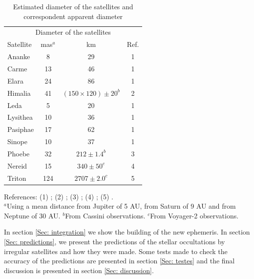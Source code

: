 \documentclass[useAMS,usenatbib]{mn2e}
\begin{document}
\begin{table}
\caption{\label{Tab: satellite-diameter} Estimated diameter of the satellites and correspondent apparent diameter}
\begin{center}
\begin{tabular}{lccc}
\hline  \hline
\multicolumn{4}{c}{Diameter of the satellites} \tabularnewline
Satellite  & mas$^ {a}$  & km & Ref. \tabularnewline
\hline
Ananke & 8 & 29 & 1 \tabularnewline
Carme & 13 & 46 & 1 \tabularnewline
Elara & 24 & 86 & 1 \tabularnewline
Himalia & 41 & $(150\times120) \pm 20^{b}$ & 2 \tabularnewline
Leda & 5 & 20 & 1 \tabularnewline
Lysithea & 10 & 36 & 1 \tabularnewline
Pasiphae & 17 & 62 & 1 \tabularnewline
Sinope & 10 & 37 & 1 \tabularnewline
\hdashline
Phoebe & 32 & $212 \pm 1.4^{b}$ & 3 \tabularnewline
\hdashline
Nereid & 15 & $340 \pm 50^{c}$ & 4 \tabularnewline
Triton & 124 & $2707 \pm 2.0^{c}$ & 5 \tabularnewline
\hline
\end{tabular}
\end{center}
References: (1) \cite{Rettig2001}; (2) \cite{Porco2003}; (3) \cite{Thomas2010}; (4) \cite{Thomas1991}; (5) \cite{Thomas2000}.\\
$^{a}${Using a mean distance from Jupiter of 5 AU, from Saturn of 9 AU and from Neptune of 30 AU.}
$^{b}${From Cassini observations.}
$^{c}${From Voyager-2 observations.}
\par
\end{table}


In section \ref{Sec: integration} we show the building of the new ephemeris. In section \ref{Sec: predictions}, we present the predictions of the stellar occultations by irregular satellites and how they were made. Some tests made to check the accuracy of the predictions are presented in section \ref{Sec: testes} and the final discussion is presented in section \ref{Sec: discussion}.
\end{document}
